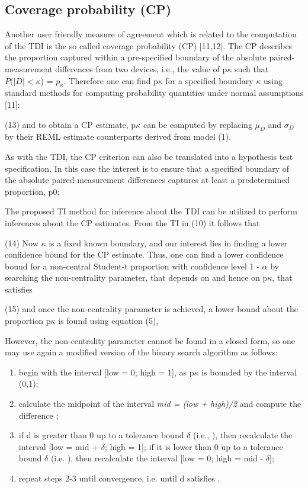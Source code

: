 \documentclass[Chap3bmain.tex]{subfiles}
\begin{document}
	
	\subsection*{Coverage probability (CP)}
	Another user friendly measure of agreement which is related to the computation of the TDI is the so called coverage probability (CP) [11,12]. 
	The CP describes the proportion captured within a pre-specified boundary of the absolute paired-measurement differences from two devices, i.e., the value of p$\kappa$ such that $P(|D| < \kappa$) = $p_\kappa$. Therefore one can find p$\kappa$ for a specified boundary $\kappa$ using standard methods for computing probability quantities under normal assumptions [11]:
	
	(13)
	and to obtain a CP estimate, p$\kappa$ can be computed by replacing $\mu_D$ and $\sigma_D$ by their REML estimate counterparts derived from model (1).
	
	As with the TDI, the CP criterion can also be translated into a hypothesis test specification. 
	In this case the interest is to ensure that a specified boundary of the absolute paired-measurement differences captures at least a predetermined proportion, p0:
	
	
	The proposed TI method for inference about the TDI can be utilized to perform inferences about the CP estimates. From the TI in (10) it follows that
	
	(14)
	Now $\kappa$ is a fixed known boundary, and our interest lies in finding a lower confidence bound for the CP estimate. 
	Thus, one can find a lower confidence bound for a non-central Student-t proportion with confidence level 1 - $\alpha$ by searching the non-centrality parameter, 
	that depends on  and hence on p$\kappa$, that satisfies
	
	(15)
	and once the non-centrality parameter  is achieved, a lower bound about the proportion p$\kappa$ is found using equation (5), 
	
	
	However, the non-centrality parameter cannot be found in a closed form, so one may use again a modified version of the binary search algorithm as follows:
	
	\begin{enumerate}
		\item begin with the interval [low = 0; high = 1], as p$\kappa$ is bounded by the interval (0,1);
		
		\item calculate the midpoint of the interval \textit{mid = (low + high)/2} and compute the difference ;
		
		\item if d is greater than 0 up to a tolerance bound $\delta$ (i.e., ), then recalculate the interval [low = mid + $\delta$; high = 1]; if it is 
		lower than 0 up to a tolerance bound $\delta$ (i.e. ), then recalculate the interval [low = 0; high = mid - $\delta$];
		
		\item repeat steps 2-3 until convergence, i.e. until d satisfies .
	\end{enumerate}
\newpage
\end{document}

